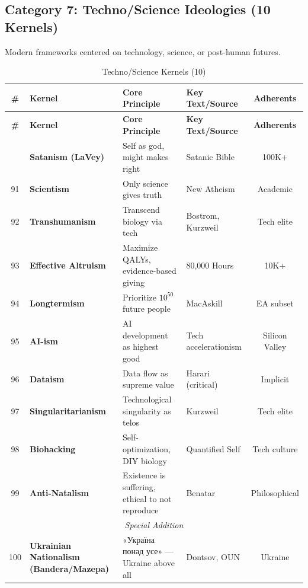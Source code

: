 \documentclass[11pt,a4paper]{article}
\theoremstyle{definition}
\theoremstyle{remark}
\begin{document}
\subsection{Category 7: Techno/Science Ideologies (10 Kernels)}

Modern frameworks centered on technology, science, or post-human futures.

\begin{longtable}{@{}clp{4cm}p{3.5cm}c@{}}
\caption{Techno/Science Kernels (10)} \label{tab:techno-kernels} \\
\toprule
\textbf{\#} & \textbf{Kernel} & \textbf{Core Principle} & \textbf{Key Text/Source} & \textbf{Adherents} \\
\midrule
\endfirsthead
\toprule
\textbf{\#} & \textbf{Kernel} & \textbf{Core Principle} & \textbf{Key Text/Source} & \textbf{Adherents} \\
\midrule
\endhead
\bottomrule
\endlastfoot
90 & \textbf{Satanism (LaVey)} & Self as god, might makes right & Satanic Bible & 100K+ \\
91 & \textbf{Scientism} & Only science gives truth & New Atheism & Academic \\
92 & \textbf{Transhumanism} & Transcend biology via tech & Bostrom, Kurzweil & Tech elite \\
93 & \textbf{Effective Altruism} & Maximize QALYs, evidence-based giving & 80,000 Hours & 10K+ \\
94 & \textbf{Longtermism} & Prioritize $10^{50}$ future people & MacAskill & EA subset \\
95 & \textbf{AI-ism} & AI development as highest good & Tech accelerationism & Silicon Valley \\
96 & \textbf{Dataism} & Data flow as supreme value & Harari (critical) & Implicit \\
97 & \textbf{Singularitarianism} & Technological singularity as telos & Kurzweil & Tech elite \\
98 & \textbf{Biohacking} & Self-optimization, DIY biology & Quantified Self & Tech culture \\
99 & \textbf{Anti-Natalism} & Existence is suffering, ethical to not reproduce & Benatar & Philosophical \\
\midrule
\multicolumn{5}{c}{\textit{Special Addition}} \\
\midrule
100 & \textbf{Ukrainian Nationalism (Bandera/Mazepa)} & «Україна понад усе» — Ukraine above all & Dontsov, OUN & Ukraine \\
\end{longtable}
\end{document}
